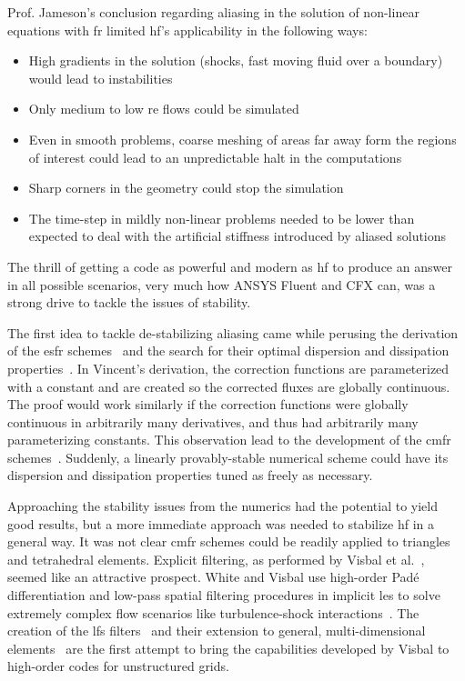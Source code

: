 Prof. Jameson's conclusion regarding aliasing in the solution of non-linear equations with \gls{fr} limited \gls{hf}'s applicability in the following ways:
\begin{itemize}
\item High gradients in the solution (shocks, fast moving fluid over a boundary) would lead to instabilities
\item Only medium to low \gls{re} flows could be simulated
\item Even in smooth problems, coarse meshing of areas far away form the regions of interest could lead to an unpredictable halt in the computations
\item Sharp corners in the geometry could stop the simulation
\item The time-step in mildly non-linear problems needed to be lower than expected to deal with the artificial stiffness introduced by aliased solutions
\end{itemize}

The thrill of getting a code as powerful and modern as \gls{hf} to produce an answer in all possible scenarios, very much how ANSYS Fluent and CFX can, was a strong drive to tackle the issues of stability.

The first idea to tackle de-stabilizing aliasing came while perusing the derivation of the \gls{esfr} schemes~\cite{vincent2011new} and the search for their optimal dispersion and dissipation properties~\cite{asthana2014high}. In Vincent's derivation, the correction functions are parameterized with a constant and are created so the corrected fluxes are globally continuous. The proof would work similarly if the correction functions were globally continuous in arbitrarily many derivatives, and thus had arbitrarily many parameterizing constants. This observation lead to the development of the \gls{cmfr} schemes~\cite{lopez2015cmfr}. Suddenly, a linearly provably-stable numerical scheme could have its dispersion and dissipation properties tuned as freely as necessary.

Approaching the stability issues from the numerics had the potential to yield good results, but a more immediate approach was needed to stabilize \gls{hf} in a general way. It was not clear \gls{cmfr} schemes could be readily applied to triangles and tetrahedral elements. Explicit filtering, as performed by Visbal et al.~\cite{visbal2003implicit}, seemed like an attractive prospect. White and Visbal use high-order Pad\'e differentiation and low-pass spatial filtering procedures in implicit \gls{les} to solve extremely complex flow scenarios like turbulence-shock interactions~\cite{white2015investigation}. The creation of the \gls{lfs} filters~\cite{asthana2014} and their extension to general, multi-dimensional elements~\cite{lopez2015stabilization} are the first attempt to bring the capabilities developed by Visbal to high-order codes for unstructured grids.